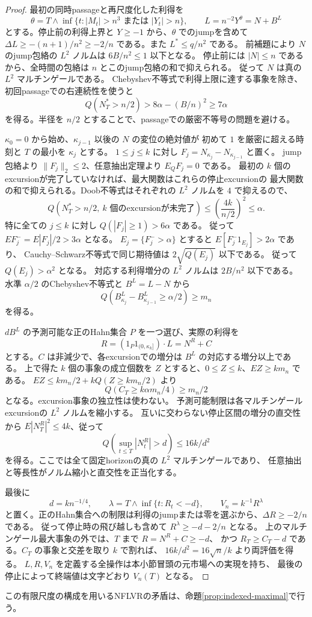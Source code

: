 \begin{proof}
最初の同時passageと再尺度化した利得を
\[
 \theta=T\wedge\inf\{t:|M_t|>n^3\text{ または }|Y_t|>n\},\qquad
 L=n^{-2}Y^\theta=N+B^L
\]
とする。停止前の利得上界と $Y\geq-1$ から、$\theta$ でのjumpを含めて
$\Delta L\geq-(n+1)/n^2\geq-2/n$ である。また $L^*\leq q/n^2$ である。
前補題により $N$ のjump包絡の $L^2$ ノルムは $6B/n^2\leq1$ 以下となる。
停止前には $|N|\leq n$ であるから、全時間の包絡は $n$ とこのjump包絡の和で抑えられる。
従って $N$ は真の $L^2$ マルチンゲールである。
Chebyshev不等式で利得上限に達する事象を除き、初回passageでの右連続性を使うと
\[
 Q(N_T^*>n/2)>8\alpha-(B/n)^2\geq7\alpha
\]
を得る。半径を $n/2$ とすることで、passageでの厳密不等号の問題を避ける。

$\kappa_0=0$ から始め、$\kappa_{j-1}$ 以後の $N$ の変位の絶対値が
初めて $1$ を厳密に超える時刻と $T$ の最小を $\kappa_j$ とする。
$1\leq j\leq k$ に対し $F_j=N_{\kappa_j}-N_{\kappa_{j-1}}$ と置く。
jump包絡より $\|F_j\|_2\leq2$、任意抽出定理より $E_QF_j=0$ である。
最初の $k$ 個のexcursionが完了していなければ、最大関数はこれらの停止excursionの
最大関数の和で抑えられる。Doob不等式はそれぞれの $L^2$ ノルムを $4$ で抑えるので、
\[
 Q(N_T^*>n/2,\ k\text{ 個のexcursionが未完了})
 \leq\left(\frac{4k}{n/2}\right)^2\leq\alpha.
\]
特に全ての $j\leq k$ に対し $Q(|F_j|\geq1)>6\alpha$ である。
従って $EF_j^-=E|F_j|/2>3\alpha$ となる。
$E_j=\{F_j^->\alpha\}$ とすると $E[F_j^-1_{E_j}]>2\alpha$ であり、
Cauchy--Schwarz不等式で同じ期待値は $2\sqrt{Q(E_j)}$ 以下である。
従って $Q(E_j)>\alpha^2$ となる。
対応する利得増分の $L^2$ ノルムは $2B/n^2$ 以下である。
水準 $\alpha/2$ のChebyshev不等式と $B^L=L-N$ から
\[
 Q(B^L_{\kappa_j}-B^L_{\kappa_{j-1}}\geq\alpha/2)\geq m_n
\]
を得る。

$dB^L$ の予測可能な正のHahn集合 $P$ を一つ選び、実際の利得を
\[
 R=(1_P1_{(0,\kappa_k]})\cdot L=N^R+C
\]
とする。$C$ は非減少で、各excursionでの増分は $B^L$ の対応する増分以上である。
上で得た $k$ 個の事象の成立個数を $Z$ とすると、$0\leq Z\leq k$、$EZ\geq km_n$ である。
$EZ\leq km_n/2+kQ(Z\geq km_n/2)$ より
\[
 Q(C_T\geq k\alpha m_n/4)\geq m_n/2
\]
となる。excursion事象の独立性は使わない。
予測可能制限は各マルチンゲールexcursionの $L^2$ ノルムを縮小する。
互いに交わらない停止区間の増分の直交性から $E|N^R_T|^2\leq4k$、従って
\[
 Q\left(\sup_{t\leq T}|N^R_t|>d\right)\leq16k/d^2
\]
を得る。ここでは全て固定horizonの真の $L^2$ マルチンゲールであり、
任意抽出と等長性がノルム縮小と直交性を正当化する。

最後に
\[
 d=kn^{-1/4},\qquad
 \lambda=T\wedge\inf\{t:R_t<-d\},\qquad V_n=k^{-1}R^\lambda
\]
と置く。正のHahn集合への制限は利得のjumpまたは零を選ぶから、$\Delta R\geq-2/n$ である。
従って停止時の飛び越しも含めて $R^\lambda\geq-d-2/n$ となる。
上のマルチンゲール最大事象の外では、$T$ まで $R=N^R+C\geq-d$、
かつ $R_T\geq C_T-d$ である。$C_T$ の事象と交差を取り $k$ で割れば、
$16k/d^2=16\sqrt n/k$ より両評価を得る。
$L,R,V_n$ を定義する全操作は本小節冒頭の元市場への実現を持ち、
最後の停止によって終端値は文字どおり $V_n(T)$ となる。
\end{proof}
この有限尺度の構成を用いるNFLVRの矛盾は、命題\ref{prop:indexed-maximal}で行う。

